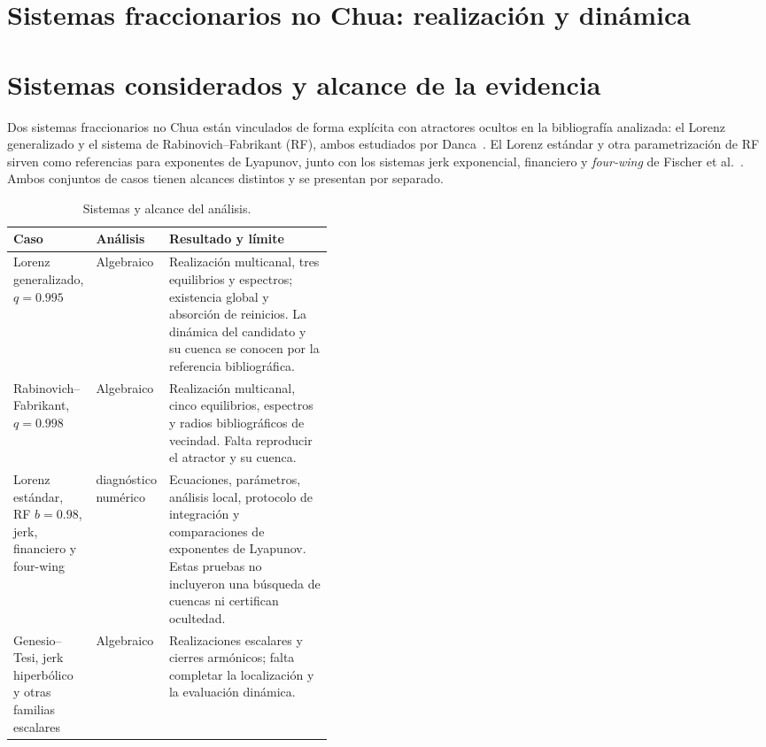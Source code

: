 \section[Candidatos fraccionarios no Chua]{Sistemas fraccionarios no Chua: realización y dinámica}
\label{part:nonchua}

\section{Sistemas considerados y alcance de la evidencia}

Dos sistemas fraccionarios no Chua están vinculados de forma explícita con
atractores ocultos en la bibliografía analizada: el Lorenz generalizado y el
sistema de Rabinovich--Fabrikant (RF), ambos estudiados por
Danca~\cite{Danca2017}. El Lorenz estándar y otra
parametrización de RF sirven como referencias para exponentes de Lyapunov, junto con
los sistemas jerk exponencial, financiero y \emph{four-wing} de
Fischer et al.~\cite{fischer2020}. Ambos conjuntos de casos tienen alcances
distintos y se presentan por separado.

\begin{table}[ht]
\centering
\small
\caption{Sistemas y alcance del análisis.}
\begin{tabularx}{\linewidth}{>{\raggedright\arraybackslash}p{0.23\linewidth}
>{\raggedright\arraybackslash}p{0.19\linewidth}X}
\toprule
Caso & Análisis & Resultado y límite\\
\midrule
Lorenz generalizado, \(q=0.995\) & Algebraico &
Realización multicanal, tres equilibrios y espectros; existencia global y
absorción de reinicios. La dinámica del candidato y su cuenca se conocen
por la referencia bibliográfica.\\
Rabinovich--Fabrikant, \(q=0.998\) & Algebraico &
Realización multicanal, cinco equilibrios, espectros y radios bibliográficos
de vecindad. Falta reproducir el atractor y su cuenca.\\
Lorenz estándar, RF \(b=0.98\), jerk, financiero y four-wing & diagnóstico
numérico & Ecuaciones, parámetros, análisis local, protocolo de integración y
comparaciones de exponentes de Lyapunov. Estas pruebas no incluyeron una
búsqueda de cuencas ni certifican ocultedad.\\
Genesio--Tesi, jerk hiperbólico y otras familias escalares & Algebraico &
Realizaciones escalares y cierres armónicos; falta completar la localización
y la evaluación dinámica.\\
\bottomrule
\end{tabularx}
\end{table}

